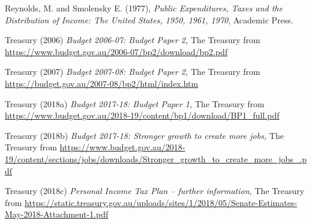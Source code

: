 \documentclass[submission]{grattan}\usepackage[]{graphicx}\usepackage[]{color}
\begin{document}
Reynolds, M. and Smolensky E. (1977), \emph{Public Expenditures, Taxes and the Distribution of Income: The United States, 1950, 1961, 1970}, Academic Press.

Treasury (2006) \emph{Budget 2006-07: Budget Paper 2,} The Treasury from \url{https://www.budget.gov.au/2006-07/bp2/download/bp2.pdf}

Treasury (2007) \emph{Budget 2007-08: Budget Paper 2,} The Treasury from \url{https://budget.gov.au/2007-08/bp2/html/index.htm}

Treasury (2018a) \emph{Budget 2017-18: Budget Paper 1,} The Treasury from \url{https://www.budget.gov.au/2018-19/content/bp1/download/BP1_full.pdf}

Treasury (2018b) \emph{Budget 2017-18: Stronger growth to create more jobs,} The Treasury from \url{https://www.budget.gov.au/2018-19/content/sections/jobs/downloads/Stronger_growth_to_create_more_jobs_.pdf}

Treasury (2018c) \emph{Personal Income Tax Plan -- further information,} The Treasury from \url{https://static.treasury.gov.au/uploads/sites/1/2018/05/Senate-Estimates-May-2018-Attachment-1.pdf}
\end{document}
